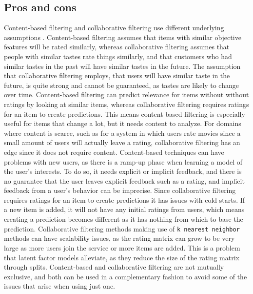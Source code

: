 \subsection{Pros and cons}
Content-based filtering and collaborative filtering use different underlying assumptions \cite{CollaborativeFiltering}.
Content-based filtering assumes that items with similar objective features will be rated similarly, whereas collaborative filtering assumes that people with similar tastes rate things similarly, and that customers who had similar tastes in the past will have similar tastes in the future.
The assumption that collaborative filtering employs, that users will have similar taste in the future, is quite strong and cannot be guaranteed, as tastes are likely to change over time.
Content-based filtering can predict relevance for items without without ratings by looking at similar items, whereas collaborative filtering requires ratings for an item to create predictions.
This means content-based filtering is especially useful for items that change a lot, but it needs content to analyze.
For domains where content is scarce, such as for a system in which users rate movies since a small amount of users will actually leave a rating, collaborative filtering has an edge since it does not require content.
Content-based techniques can have problems with new users, as there is a ramp-up phase when learning a model of the user's interests.
To do so, it needs explicit or implicit feedback, and there is no guarantee that the user leaves explicit feedback such as a rating, and implicit feedback from a user's behavior can be imprecise.
Since collaborative filtering requires ratings for an item to create predictions it has issues with cold starts.
If a new item is added, it will not have any initial ratings from users, which means creating a prediction becomes different as it has nothing from which to base the prediction.
Collaborative filtering methods making use of \texttt{k nearest neighbor} methods can have scalability issues, as the rating matrix can grow to be very large as more users join the service or more items are added.
This is a problem that latent factor models alleviate, as they reduce the size of the rating matrix through splits.
Content-based and collaborative filtering are not mutually exclusive, and both can be used in a complementary fashion to avoid some of the issues that arise when using just one.

